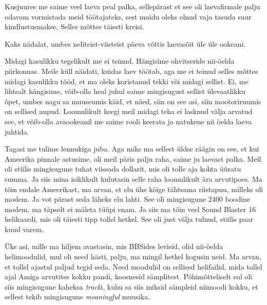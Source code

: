 Kusjuures me saime veel laeva peal palka, sellepärast et see oli laevafirmale palju odavam vormistada meid töötajateks, sest muidu oleks olnud vaja tasuda suur kindlustusmakse. Selles mõttes täiesti kreisi.


Kaks nädalat, umbes neliteist-viisteist päeva võttis laevasõit üle üle ookeani.


Midagi kasulikku tegelikult me ei teinud. Hängisime ohvitseride nii-öelda piirkonnas. Meile küll näidati, kuidas laev töötab, aga me ei teinud selles mõttes midagi kasulikku tööd, et ma oleks  koristanud tekki või midagi sellist. Ei, me lihtsalt hängisime, võib-olla heal juhul saime mingisugust sellist  ülevaatlikku õpet, umbes nagu sa muuseumis käid, et näed, siin on see asi, siin mootoriruumis on sellised nupud. Loomulikult keegi meil midagi teha ei lasknud välja arvatud see, et võib-olla avaookeanil me saime rooli keerata ja natukene nii öelda laeva juhtida.


Tagasi me tulime lennukiga juba. Aga miks ma sellest üldse räägin on see, et kui Ameerika pinnale astusime, oli meil päris palju raha, saime ju laevast palka. Meil oli stiilis mingisugune tuhat viissada dollarit, mis oli tolle aja kohta üüratu summa. Ja siis mina isiklikult kulutasin selle raha loomulikult ära arvutipoes. Ma tõin endale Ameerikast, ma arvan, et elu ühe kõige tähtsama riistapuu, milleks oli modem. Ja vot pärast seda läheks elu lahti. See oli mingisugune 2400 boodine modem, ma täpselt ei mäleta tüüpi enam. Ja siis ma tõin veel Sound Blaster 16 helikaardi, mis oli täiesti tipp tollel hetkel. See oli just välja tulnud, stiilis paar kuud varem. 

Üks asi, mille ma  hiljem avastasin, mis BBSides levisid, olid nii-öelda helimoodulid,  mul oli need hästi, palju, ma mingil hetkel kogusin neid. Ma arvan, et tollel ajastul paljud tegid seda. Need moodulid on  sellised helifailid, mida tollel ajal Amiga arvutites kokku pandi, koosnesid sämplitest. Põhimõtteliselt sul oli siis mingisugune kaheksa \emph{track}i, kuhu sa siis miksid sämpleid niimoodi kokku, et sellest tekib mingisugune \emph{meaningful} muusika. 

